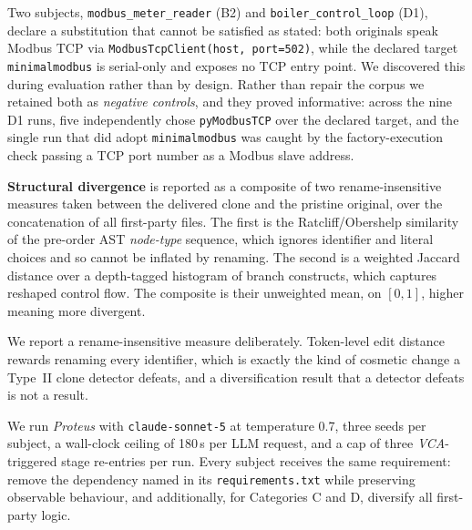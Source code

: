 Two subjects, \texttt{modbus\_meter\_reader} (B2) and
\texttt{boiler\_control\_loop} (D1), declare a substitution that cannot be
satisfied as stated: both originals speak Modbus TCP via
\texttt{ModbusTcpClient(host, port=502)}, while the declared target
\texttt{minimalmodbus} is serial-only and exposes no TCP entry point. We
discovered this during evaluation rather than by design. Rather than repair the
corpus we retained both as \emph{negative controls}, and they proved
informative: across the nine D1 runs, five independently chose
\texttt{pyModbusTCP} over the declared target, and the single run that did
adopt \texttt{minimalmodbus} was caught by the factory-execution check passing
a TCP port number as a Modbus slave address.


\textbf{Structural divergence} is reported as a composite of two
rename-insensitive measures taken between the delivered clone and the pristine
original, over the concatenation of all first-party files. The first is the
Ratcliff/Obershelp similarity of the pre-order AST \emph{node-type} sequence,
which ignores identifier and literal choices and so cannot be inflated by
renaming. The second is a weighted Jaccard distance over a depth-tagged
histogram of branch constructs, which captures reshaped control flow. The
composite is their unweighted mean, on $[0,1]$, higher meaning more divergent.

We report a rename-insensitive measure deliberately. Token-level edit distance
rewards renaming every identifier, which is exactly the kind of cosmetic change
a Type~II clone detector defeats, and a diversification result that a detector
defeats is not a result.


We run \emph{Proteus} with \texttt{claude-sonnet-5} at temperature 0.7, three
seeds per subject, a wall-clock ceiling of 180\,s per LLM request, and a cap of
three \emph{VCA}-triggered stage re-entries per run. Every subject receives the
same requirement: remove the dependency named in its \texttt{requirements.txt}
while preserving observable behaviour, and additionally, for Categories C and
D, diversify all first-party logic.

